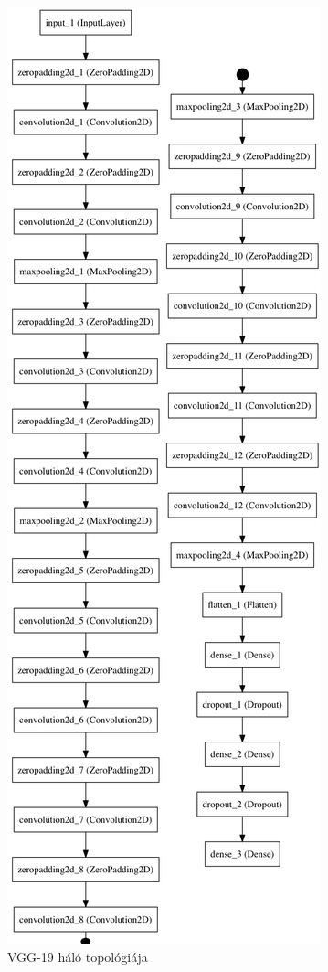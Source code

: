 \documentclass[12pt, a4paper, oneside]{book}
\theoremstyle{tetel}
\begin{document}
\begin{figure}[h]
	\begin{center}
		\includegraphics[scale=0.3]{vgg19_cropped.png}
		\caption{VGG-19 háló topológiája\cite{30}}
		\label{vgg_19}
	\end{center}
\end{figure}
\end{document}
